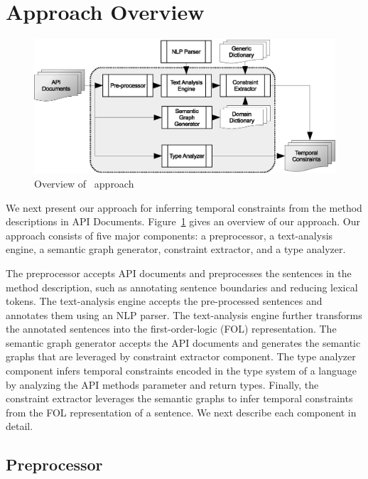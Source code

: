 \section{Approach Overview}
\label{sec:approach}


\begin{figure}
	\centering
		\includegraphics[scale=0.45]{approach.eps}
	\caption{Overview of \tool\ approach}
	\label{fig:approachOverview}
\end{figure}

We next present our approach for inferring temporal constraints from the method descriptions in API Documents.
Figure~\ref{fig:approachOverview} gives an overview of our approach.
Our approach consists of five major components: a preprocessor, a text-analysis engine, a semantic graph generator, constraint extractor, and a type analyzer.

The preprocessor accepts API documents and preprocesses the sentences in the method description,
such as annotating sentence boundaries and reducing lexical tokens.
The text-analysis engine accepts the pre-processed sentences and annotates them using an NLP parser.
The text-analysis engine further transforms the annotated sentences into the first-order-logic (FOL) representation.
The semantic graph generator accepts the API documents and generates the semantic graphs that are leveraged by constraint extractor component.
The type analyzer component infers temporal constraints encoded in the type system of a language by analyzing the API methods parameter and return types.
Finally, the constraint extractor leverages the semantic graphs to infer temporal constraints from the FOL representation of a sentence.
We next describe each component in detail.


\subsection{Preprocessor}
\label{sub:prep}

